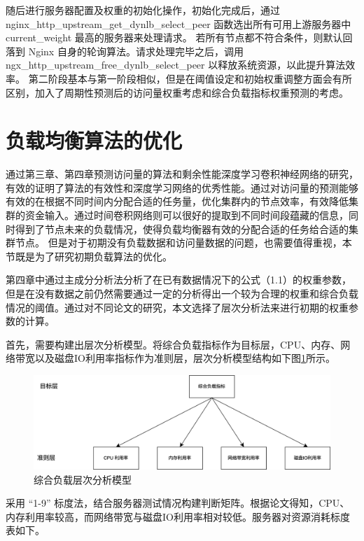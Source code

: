 随后进行服务器配置及权重的初始化操作，初始化完成后，通过 nginx\_http\_upstream\_get\_dynlb\_select\_peer
函数选出所有可用上游服务器中 current\_weight 最高的服务器来处理请求。
若所有节点都不符合条件，则默认回落到 Nginx 自身的轮询算法。请求处理完毕之后，调用 ngx\_http\_upstream\_free\_dynlb\_select\_peer 以释放系统资源，以此提升算法效率。
第二阶段基本与第一阶段相似，但是在阈值设定和初始权重调整方面会有所区别，加入了周期性预测后的访问量权重考虑和综合负载指标权重预测的考虑。

\section{负载均衡算法的优化}
通过第三章、第四章预测访问量的算法和剩余性能深度学习卷积神经网络的研究，有效的证明了算法的有效性和深度学习网络的优秀性能。通过对访问量的预测能够有效的在根据不同时间内分配合适的任务量，优化集群内的节点效率，有效降低集群的资金输入。通过时间卷积网络则可以很好的提取到不同时间段蕴藏的信息，同时得到了节点未来的负载情况，使得负载均衡器有效的分配合适的任务给合适的集群节点。
但是对于初期没有负载数据和访问量数据的问题，也需要值得重视，本节既是为了研究初期负载算法的优化。

第四章中通过主成分分析法分析了在已有数据情况下的公式（1.1）的权重参数，但是在没有数据之前仍然需要通过一定的分析得出一个较为合理的权重和综合负载情况的阈值。通过对不同论文的研究\cite{吴文辉2013编程计算层次分析法}，本文选择了层次分析法来进行初期的权重参数的计算。

首先，需要构建出层次分析模型。将综合负载指标作为目标层，CPU、内存、网络带宽以及磁盘IO利用率指标作为准则层，层次分析模型结构如下图\ref{Layered_Analysis}所示。

\begin{figure}[htbp]
	\centering
	\includegraphics[width=\textwidth]{figures/Layered_Analysis.jpg}
	\caption{综合负载层次分析模型}
	\label{Layered_Analysis}
\end{figure}

采用 “1-9” 标度法，结合服务器测试情况构建判断矩阵。根据论文得知，CPU、内存利用率较高，而网络带宽与磁盘IO利用率相对较低\cite{吴陈2020基于Nginx的服务器集群负载均衡策略的研究与改进}。服务器对资源消耗标度表如下。

